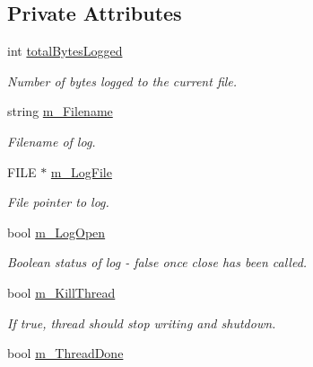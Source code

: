 \subsection*{Private Attributes}
\begin{DoxyCompactItemize}
\item 
\hypertarget{class_logger_a86aa66ebcf4c291967e183c99d65dc27}{
int \hyperlink{class_logger_a86aa66ebcf4c291967e183c99d65dc27}{totalBytesLogged}}
\label{class_logger_a86aa66ebcf4c291967e183c99d65dc27}

\begin{DoxyCompactList}\small\item\em Number of bytes logged to the current file. \end{DoxyCompactList}\item 
\hypertarget{class_logger_ae1edce714a5ff78f0db68554ef87fc64}{
string \hyperlink{class_logger_ae1edce714a5ff78f0db68554ef87fc64}{m\_\-Filename}}
\label{class_logger_ae1edce714a5ff78f0db68554ef87fc64}

\begin{DoxyCompactList}\small\item\em Filename of log. \end{DoxyCompactList}\item 
\hypertarget{class_logger_af5557c3fb29120e5eb8303b3f06f1219}{
FILE $\ast$ \hyperlink{class_logger_af5557c3fb29120e5eb8303b3f06f1219}{m\_\-LogFile}}
\label{class_logger_af5557c3fb29120e5eb8303b3f06f1219}

\begin{DoxyCompactList}\small\item\em File pointer to log. \end{DoxyCompactList}\item 
\hypertarget{class_logger_ada328a5074245919b6e587bbe192d0b3}{
bool \hyperlink{class_logger_ada328a5074245919b6e587bbe192d0b3}{m\_\-LogOpen}}
\label{class_logger_ada328a5074245919b6e587bbe192d0b3}

\begin{DoxyCompactList}\small\item\em Boolean status of log -\/ false once close has been called. \end{DoxyCompactList}\item 
\hypertarget{class_logger_aa5086e90b974c0eda04acfdbdb5b2be7}{
bool \hyperlink{class_logger_aa5086e90b974c0eda04acfdbdb5b2be7}{m\_\-KillThread}}
\label{class_logger_aa5086e90b974c0eda04acfdbdb5b2be7}

\begin{DoxyCompactList}\small\item\em If true, thread should stop writing and shutdown. \end{DoxyCompactList}\item 
\hypertarget{class_logger_a6a4c2e1e67f2b8f85dbdcec35f83c85f}{
bool \hyperlink{class_logger_a6a4c2e1e67f2b8f85dbdcec35f83c85f}{m\_\-ThreadDone}}
\label{class_logger_a6a4c2e1e67f2b8f85dbdcec35f83c85f}


\end{DoxyCompactItemize}
